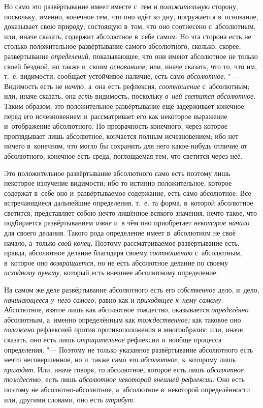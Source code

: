 Но само это развёртывание имеет вместе с~тем и
{\em положительную} сторону, поскольку, именно,
конечное тем, что оно идёт ко дну, погружается в~основание, доказывает свою
природу, состоящую в~том, что оно соотнесено с~абсолютным, или, иначе
сказать, содержит абсолютное в~себе самом. Но эта сторона есть не столько
положительное развёртывание самого абсолютного, сколько, скорее,
развёртывание {\em определений,} показывающее, что они
имеют абсолютное не только своей бездной, но также и~своим
{\em основанием,} или, иначе сказать, что то, что им,
т.~е. видимости, сообщает устойчивое наличие, есть само
{\em абсолютное}. "--- Видимость есть не
{\em ничто,} а~она есть рефлексия,
{\em соотношение} с~абсолютным; или, иначе сказать, она
{\em есть} видимость, поскольку
{\em в~ней светится абсолютное}. Таким образом, это
положительное развёртывание ещё задерживает конечное перед его
исчезновением и~рассматривает его как некоторое выражение и~отображение
абсолютного. Но прозрачность конечного, через которое проглядывает лишь
абсолютное, кончается полным исчезновением; ибо нет ничего в~конечном, что
могло бы сохранить для него какое-нибудь отличие от абсолютного; конечное
есть среда, поглощаемая тем, что светится через неё.

Это положительное развёртывание абсолютного само есть поэтому лишь некоторое
излучение видимости; ибо то истинно положительное, которое содержат в~себе
оно и~развёртываемое содержание, есть само абсолютное. Все встречающиеся
дальнейшие определения, т.~е. та форма, в~которой абсолютное светится,
представляет собою нечто лишённое всякого значения, нечто такое, что
подбирается развёртыванием {\em извне} и~в чём оно
приобретает {\em некоторое начало} для своего делания.
Такого рода определение имеет в~абсолютном не своё начало, а~только
{\em свой конец}. Поэтому рассматриваемое развёртывание
есть, правда, абсолютное делание благодаря своему
{\em соотношению} с~абсолютным, в~которое оно
{\em возвращается,} но не есть абсолютное делание по
своему {\em исходному пункту,} который есть внешнее
абсолютному определение.

На самом же деле развёртывание абсолютного есть его
{\em собственное} дело, и~дело,
{\em начинающееся у~него самого,} равно как и
{\em приходящее к~нему самому}. Абсолютное, взятое лишь
как абсолютное тождество, оказывается {\em определённо}
абсолютным, а~именно определённым как
{\em тождественное;} как таковое оно
{\em положено} рефлексией против противоположения и
многообразия; или, иначе сказать, оно есть лишь
{\em отрицательное} рефлексии и~вообще процесса
определения. "--- Поэтому не только указанное развёртывание абсолютного есть
нечто несовершенное, но и~также само это
{\em абсолютное,} к~которому лишь
{\em приходят}. Или, иначе говоря, то абсолютное,
которое есть лишь {\em абсолютное тождество,} есть лишь
{\em абсолютное некоторой внешней рефлексии}. Оно есть
поэтому не абсолютно-абсолютное, а~абсолютное в~некоторой определённости
или, другими словами, оно есть {\em атрибут}.

